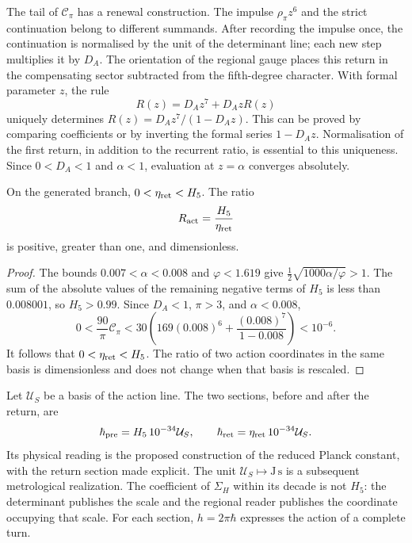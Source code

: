 The tail of \(\mathcal C_\pi\) has a renewal construction.
The impulse \(\rho_\pi z^6\) and the strict continuation belong
to different summands. After recording the impulse once,
the continuation is normalised by the unit of the determinant line;
each new step multiplies it by \(D_A\). The orientation of the
regional gauge places this return in the compensating sector
subtracted from the fifth-degree character.
With formal parameter \(z\), the rule
\begin{equation}
 R(z)=D_Az^7+D_AzR(z)
 \label{vi:vi:dep:renovacion}
\end{equation}
uniquely determines
\(R(z)=D_Az^7/(1-D_Az)\). This can be proved by comparing
coefficients or by inverting the formal series \(1-D_Az\).
Normalisation of the first return, in addition to the recurrent ratio,
is essential to this uniqueness. Since \(0<D_A<1\) and \(\alpha<1\),
evaluation at \(z=\alpha\) converges absolutely.

\begin{proposition}
\label{vi:vi:dep:positividad-accion}
On the generated branch, \(0<\eta_{\rm ret}<H_5\). The ratio
\begin{equation}
 R_{\rm act}=\frac{H_5}{\eta_{\rm ret}}
 \label{vi:vi:dep:Ract}
\end{equation}
is positive, greater than one, and dimensionless.
\end{proposition}
\begin{proof}
The bounds \(0.007<\alpha<0.008\) and \(\varphi<1.619\) give
\(\tfrac12\sqrt{1000\alpha/\varphi}>1\). The sum of the absolute
values of the remaining negative terms of \(H_5\) is less than
\(0.008001\), so \(H_5>0.99\).
Since \(D_A<1\), \(\pi>3\), and \(\alpha<0.008\),
\[
 0<\frac{90}{\pi}\mathcal C_\pi
 <30\left(169(0.008)^6+
                  \frac{(0.008)^7}{1-0.008}\right)<10^{-6}.
\]
It follows that \(0<\eta_{\rm ret}<H_5\). The ratio of two action
coordinates in the same basis is dimensionless and does not change when
that basis is rescaled.
\end{proof}

Let \(\mathcal U_S\) be a basis of the action line. The two
sections, before and after the return, are
\begin{equation}
 \hbar_{\rm pre}=H_5\,10^{-34}\mathcal U_S,
 \qquad
 \hbar_{\rm ret}=\eta_{\rm ret}\,10^{-34}\mathcal U_S.
 \label{vi:vi:dep:hbar}
\end{equation}
Its physical reading is the proposed construction of the reduced Planck
constant, with the return section made explicit. The unit
\(\mathcal U_S\mapsto\mathrm{J\,s}\) is a subsequent metrological
realization. The coefficient of \(\Sigma_H\) within its decade is not
\(H_5\): the determinant publishes the scale and the regional reader
publishes the coordinate occupying that scale. For each section,
\(h=2\pi\hbar\) expresses the action of a complete turn.

